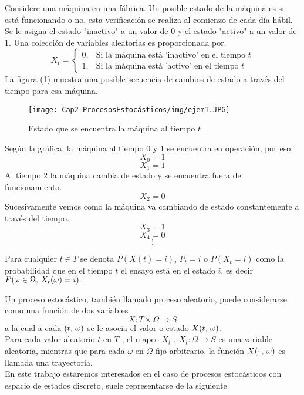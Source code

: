 \begin{Ejm}
    Considere una máquina en una fábrica. Un posible estado de la máquina es si está funcionando o no, esta verificación se realiza al comienzo de cada día hábil. Se le asigna el estado "inactivo" a un valor de $0$ y el estado "activo" a un valor de $1$. Una colección de variables aleatorias es proporcionada por.
    $$X_t=
    \label{ejm-procEstocástico}
    \begin{cases}
        0, & \mbox{Si la máquina está 'inactivo' en el tiempo $t$}\\
        1, & \mbox{Si la máquina está 'activo' en el tiempo $t$}
    \end{cases}$$
    La figura (\ref{fig-procesoEstocástico-Ejemplo}) muestra una posible secuencia de cambios de estado a través del tiempo para esa máquina.
    \begin{center}
        \begin{figure}[htb]
            \begin{center}
             \texttt{[image: Cap2-ProcesosEstocásticos/img/ejem1.JPG]}
                \vspace*{0.05in}
            \end{center}
            \caption{Estado que se encuentra la máquina al tiempo $t$ }
            \label{fig-procesoEstocástico-Ejemplo}
        \end{figure}
    \end{center}
    Según la gráfica, la máquina al tiempo $0$ y $1$ se encuentra en operación, por eso:
    $$X_0=1$$
    $$X_1=1$$
    Al tiempo $2$ la máquina cambia de estado y se encuentra fuera de funcionamiento. 
    $$X_2=0$$
   Sucesivamente vemos como la máquina va cambiando de estado constantemente a través del tiempo.
    $$X_3=1$$
    $$X_4=0$$
    $$\vdots$$
\end{Ejm}
\begin{Obs}
Para cualquier $t\in T$ se denota $P(X(t)=i)$, $P_t=i$ o $P(X_t=i)$ como la probabilidad que en el tiempo $t$ el ensayo está en el estado $i$, es decir $P(\omega\in\Omega,\thinspace X_t(\omega)=i).$
\end{Obs}
Un proceso estocástico, también llamado proceso aleatorio, puede considerarse como una función de dos variables
$$X:T\times\Omega\rightarrow S$$ a la cual a cada $(t,\thinspace\omega)$ se le asocia el valor o estado $X (t,\thinspace\omega) $.\\
Para cada valor aleatorio $t$ en $T$ , el mapeo $X_t$ , $X_t: \Omega\rightarrow S$ es una variable aleatoria, mientras que para cada $\omega$ en $\Omega$ fijo arbitrario, la función $X(\cdot\thinspace,\thinspace\omega)$ es llamada una trayectoria.\\En este trabajo estaremos interesados en el caso de procesos estocásticos con espacio de estados discreto, suele representarse de la siguiente
